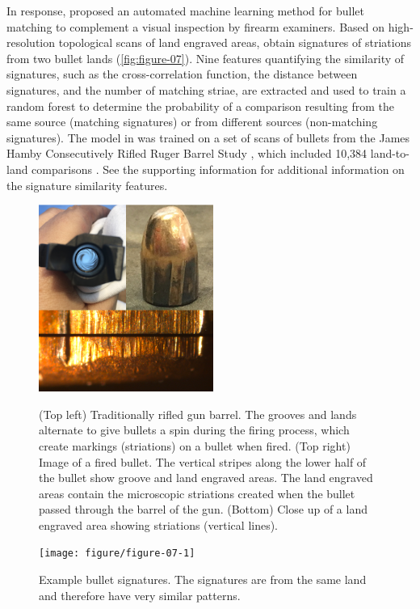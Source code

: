 \documentclass[AMS,STIX2COL]{WileyNJD-v2}\usepackage[]{graphicx}\usepackage[]{color}
\newenvironment{knitrout}{}{} %
\begin{document}
In response, \citet{hare:2017} proposed an automated machine learning method for bullet matching to complement a visual inspection by firearm examiners. Based on high-resolution topological scans of land engraved areas, \citet{hare:2017} obtain signatures of striations from two bullet lands (\autoref{fig:figure-07}). Nine features quantifying the similarity of signatures, such as the cross-correlation function, the distance between signatures, and the number of matching striae, are extracted and used to train a random forest to determine the probability of a comparison resulting from the same source (matching signatures) or from different sources (non-matching signatures). The model in \citet{hare:2017} was trained on a set of scans of bullets from the James Hamby Consecutively Rifled Ruger Barrel Study \citep{hamby:2009}, which included 10,384 land-to-land comparisons \citep{hare:2017}. See the supporting information for additional information on the signature similarity features.

\begin{figure}[!t]
\centering
\begin{knitrout}
\color{fgcolor}

{\centering \includegraphics[width=2.25in]{figure-static/figure-06-1} 

}


\end{knitrout}
\caption{(Top left) Traditionally rifled gun barrel. The grooves and lands alternate to give bullets a spin during the firing process, which create markings (striations) on a bullet when fired. (Top right) Image of a fired bullet. The vertical stripes along the lower half of the bullet show groove and land engraved areas. The land engraved areas contain the microscopic striations created when the bullet passed through the barrel of the gun. (Bottom) Close up of a land engraved area showing striations (vertical lines).}
\label{fig:figure-06}

\vspace*{\floatsep}

\begin{knitrout}
\color{fgcolor}

{\centering \texttt{[image: figure/figure-07-1]} 

}


\end{knitrout}
\caption{Example bullet signatures. The signatures are from the same land and therefore have very similar patterns.}
\label{fig:figure-07}
\end{figure}
\end{document}
